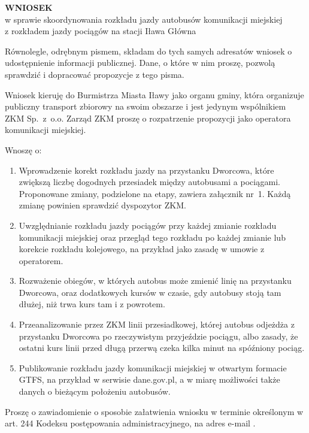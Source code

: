 


\Naglowek

\begin{center}
{\large\bfseries WNIOSEK}\\[2pt]
w sprawie skoordynowania rozkładu jazdy autobusów komunikacji miejskiej\\
z rozkładem jazdy pociągów na stacji Iława Główna
\end{center}

\Wstep{} Równolegle, odrębnym pismem, składam do tych samych adresatów wniosek o udostępnienie informacji publicznej. Dane, o które w nim proszę, pozwolą sprawdzić i dopracować propozycje z tego pisma.


Wniosek kieruję do Burmistrza Miasta Iławy jako organu gminy, która organizuje publiczny transport zbiorowy na swoim obszarze i jest jedynym wspólnikiem ZKM Sp.\ z~o.o. Zarząd ZKM proszę o rozpatrzenie propozycji jako operatora komunikacji miejskiej.

Wnoszę o:
\begin{enumerate}
\item Wprowadzenie korekt rozkładu jazdy na przystanku Dworcowa, które zwiększą liczbę dogodnych przesiadek między autobusami a pociągami. Proponowane zmiany, podzielone na etapy, zawiera załącznik nr~1. Każdą zmianę powinien sprawdzić dyspozytor ZKM.
\item Uwzględnianie rozkładu jazdy pociągów przy każdej zmianie rozkładu komunikacji miejskiej oraz przegląd tego rozkładu po każdej zmianie lub korekcie rozkładu kolejowego, na przykład jako zasadę w umowie z operatorem.
\item Rozważenie obiegów, w których autobus może zmienić linię na przystanku Dworcowa, oraz dodatkowych kursów w czasie, gdy autobusy stoją tam dłużej, niż trwa kurs tam i z powrotem.
\item Przeanalizowanie przez ZKM linii przesiadkowej, której autobus odjeżdża z przystanku Dworcowa po rzeczywistym przyjeździe pociągu, albo zasady, że ostatni kurs linii przed długą przerwą czeka kilka minut na spóźniony pociąg.
\item Publikowanie rozkładu jazdy komunikacji miejskiej w otwartym formacie GTFS, na przykład w serwisie dane.gov.pl, a w miarę możliwości także danych o bieżącym położeniu autobusów.
\end{enumerate}

\Uzasadnienie

Proszę o zawiadomienie o sposobie załatwienia wniosku w terminie określonym w art. 244 Kodeksu postępowania administracyjnego, na adres e-mail \EmailNadawcy.

\Podpis

\MaterialyIZalaczniki

\Zalaczniki

